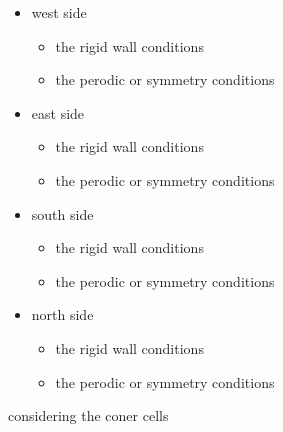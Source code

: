 \begin{itemize}
\item west side

\begin{itemize}
\item the rigid wall conditions\end{itemize}


\begin{itemize}
\item the perodic or symmetry conditions \end{itemize}


\item east side \begin{itemize}
\item the rigid wall conditions

\item the perodic or symmetry conditions\end{itemize}


\item south side

\begin{itemize}
\item the rigid wall conditions

\item the perodic or symmetry conditions\end{itemize}


\item north side

\begin{itemize}
\item the rigid wall conditions

\item the perodic or symmetry conditions\end{itemize}
\end{itemize}


considering the coner cells

